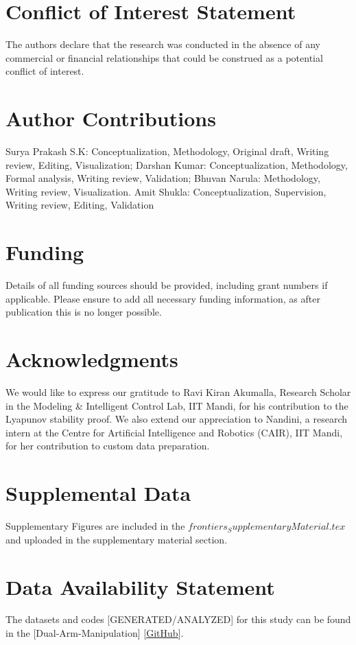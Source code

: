 \documentclass[utf8]{FrontiersinHarvard}
\begin{document}
\section*{Conflict of Interest Statement}
The authors declare that the research was conducted in the absence of any commercial or financial relationships that could be construed as a potential conflict of interest.

\section*{Author Contributions}
Surya Prakash S.K: Conceptualization, Methodology, Original draft, Writing review, Editing, Visualization; Darshan Kumar: Conceptualization, Methodology, Formal analysis, Writing review, Validation; Bhuvan Narula: Methodology, Writing review, Visualization. Amit Shukla:  Conceptualization, Supervision, Writing review, Editing, Validation   

\section*{Funding}
Details of all funding sources should be provided, including grant numbers if applicable. Please ensure to add all necessary funding information, as after publication this is no longer possible.

\section*{Acknowledgments}
We would like to express our gratitude to Ravi Kiran Akumalla, Research Scholar in the Modeling \& Intelligent Control Lab, IIT Mandi, for his contribution to the Lyapunov stability proof. We also extend our appreciation to Nandini, a research intern at the Centre for Artificial Intelligence and Robotics (CAIR), IIT Mandi, for her contribution to custom data preparation.

\section*{Supplemental Data}
 Supplementary Figures are included in the \textit{$frontiers_SupplementaryMaterial.tex$} and uploaded in the supplementary material section. 

\section*{Data Availability Statement}
The datasets and codes [GENERATED/ANALYZED] for this study can be found in the [Dual-Arm-Manipulation] [\href{https://github.com/suryarobotcontrol/Dual-Arm-Manipulation.git}{GitHub}].
\end{document}
